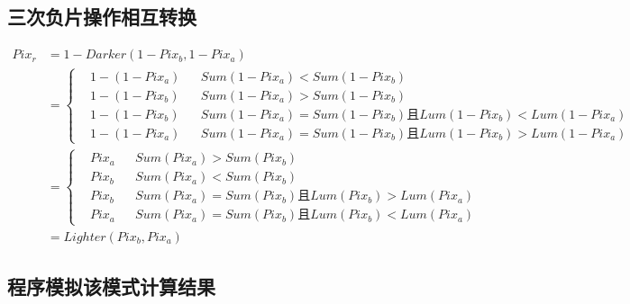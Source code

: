 \subsection{ 三次负片操作相互转换}
\begin{equation}\begin{aligned}
		Pix_r &=1-Darker(1-Pix_b,1-Pix_a)\\&=\left\{\begin{aligned}&1-(1-Pix_a) && Sum(1-Pix_a)<Sum(1-Pix_b)\\&1-(1-Pix_b)&&  Sum(1-Pix_a)>Sum(1-Pix_b)\\&1-(1-Pix_b)&&  Sum(1-Pix_a)=Sum(1-Pix_b)\text{且}Lum(1-Pix_b)<Lum(1-Pix_a)\\&1-(1-Pix_a)&&  Sum(1-Pix_a)=Sum(1-Pix_b)\text{且}Lum(1-Pix_b)>Lum(1-Pix_a)\end{aligned}\right.\\&=\left\{\begin{aligned}&Pix_a&& Sum(Pix_a)>Sum(Pix_b)\\&Pix_b&&  Sum(Pix_a)<Sum(Pix_b)\\&Pix_b&&  Sum(Pix_a)=Sum(Pix_b)\text{且}Lum(Pix_b)>Lum(Pix_a)\\&Pix_a&&  Sum(Pix_a)=Sum(Pix_b)\text{且}Lum(Pix_b)<Lum(Pix_a)\end{aligned}\right.\\&=Lighter(Pix_b,Pix_a)
\end{aligned}\end{equation}


\subsection{ 程序模拟该模式计算结果}

